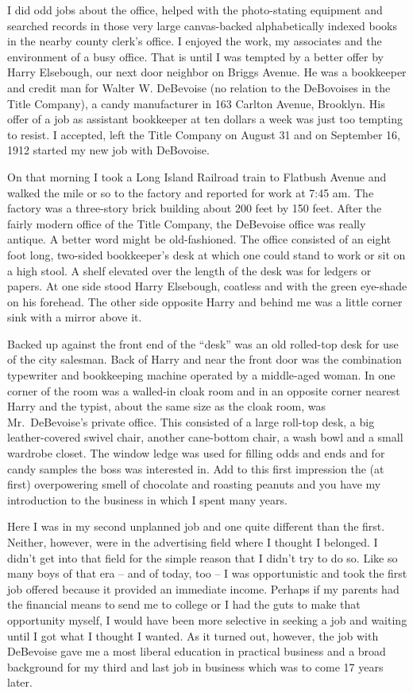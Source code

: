 \documentclass[12pt]{book}              %
\begin{document}
I did odd jobs about the office, helped with the photo-stating equipment and searched records in those very large canvas-backed alphabetically indexed books in the nearby county clerk's office. I enjoyed the work, my associates and the environment of a busy office. That is until I was tempted by a better offer by Harry Elsebough, our next door neighbor on Briggs Avenue. He was a bookkeeper and credit man for Walter W. DeBevoise (no relation to the DeBovoises in the Title Company), a candy manufacturer in 163 Carlton Avenue, Brooklyn. His offer of a job as assistant bookkeeper at ten dollars a week was just too tempting to resist. I accepted, left the Title Company on August 31 and on September 16, 1912 started my new job with DeBovoise.

On that morning I took a Long Island Railroad train to Flatbush Avenue and walked the mile or so to the factory and reported for work at 7:45 am. The factory was a three-story brick building about 200 feet by 150 feet. After the fairly modern office of the Title Company, the DeBevoise office was really antique. A better word might be old-fashioned. The office consisted of an eight foot long, two-sided bookkeeper's desk at which one could stand to work or sit on a high stool. A shelf elevated over the length of the desk was for ledgers or papers. At one side stood Harry Elsebough, coatless and with the green eye-shade on his forehead. The other side opposite Harry and behind me was a little corner sink with a mirror above it. 

Backed up against the front end of the ``desk'' was an old rolled-top desk for use of the city salesman. Back of Harry and near the front door was the combination typewriter and bookkeeping machine operated by a middle-aged woman. In one corner of the room was a walled-in cloak room and in an opposite corner nearest Harry and the typist, about the same size as the cloak room, was Mr.~DeBevoise's private office. This consisted of a large roll-top desk, a big leather-covered swivel chair, another cane-bottom chair, a wash bowl and a small wardrobe closet. The window ledge was used for filling odds and ends and for candy samples the boss was interested in. Add to this first impression the (at first) overpowering smell of chocolate and roasting peanuts and you have my introduction to the business in which I spent many years.

Here I was in my second unplanned job and one quite different than the first. Neither, however, were in the advertising field where I thought I belonged. I didn't get into that field for the simple reason that I didn't try to do so. Like so many boys of that era -- and of today, too -- I was opportunistic and took the first job offered because it provided an immediate income. Perhaps if my parents had the financial means to send me to college or I had the guts to make that opportunity myself, I would have been more selective in seeking a job and waiting until I got what I thought I wanted. As it turned out, however, the job with DeBevoise gave me a most liberal education in practical business and a broad background for my third and last job in business which was to come 17 years later.
\end{document}
